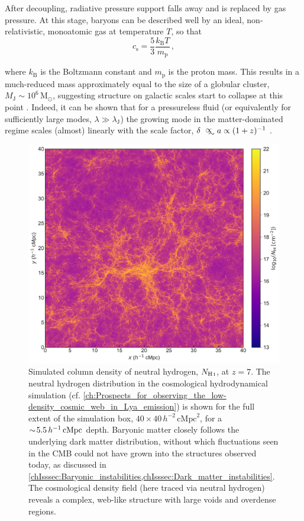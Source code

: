 After decoupling, radiative pressure support falls away and is replaced by gas pressure. At this stage, baryons can be described well by an ideal, non-relativistic, monoatomic gas at temperature $T$, so that
\begin{equation}
    \label{chIeq:Ideal_gas}
    c_\text{s} = \frac{5}{3} \frac{k_\text{B} T}{m_\text{p}} \, ,
\end{equation}

\noindent where $k_\text{B}$ is the Boltzmann constant and $m_\text{p}$ is the proton mass. This results in a much-reduced \citeauthor{1902RSPTA.199....1J} mass approximately equal to the size of a globular cluster, $M_\text{J} \sim 10^{6} \, \mathrm{M_\odot}$, suggesting structure on galactic scales start to collapse at this point \citep{2010gfe..book.....M}. Indeed, it can be shown that for a pressureless fluid (or equivalently for sufficiently large modes, $\lambda \gg \lambda_\text{J}$) the growing mode in the matter-dominated regime scales (almost) linearly with the scale factor, $\delta \appropto a \propto (1+z)^{-1}$ \citep{1992ARA&A..30..499C}.
\begin{figure}
    \centering
    \includegraphics[width=\linewidth]{"Figs/Neutral_gas_distribution"}
    \caption[Simulated column density of neutral hydrogen at $z = 7$.]{Simulated column density of neutral hydrogen, $N_\text{\ion{H}{I}}$, at $z = 7$. The neutral hydrogen distribution in the cosmological hydrodynamical simulation (cf. \cref{ch:Prospects_for_observing_the_low-density_cosmic_web_in_Lya_emission}) is shown for the full extent of the simulation box, $40 \times 40 \, h^{-2} \, \mathrm{cMpc}^2$, for a $\sim \! 5.5 \, h^{-1} \, \mathrm{cMpc}$ depth. Baryonic matter closely follows the underlying dark matter distribution, without which fluctuations seen in the CMB could not have grown into the structures observed today, as discussed in \cref{chIsssec:Baryonic_instabilities,chIsssec:Dark_matter_instabilities}. The cosmological density field (here traced via neutral hydrogen) reveals a complex, web-like structure with large voids and overdense regions.}
    \label{chIfig:Neutral_gas_distribution}
\end{figure}

